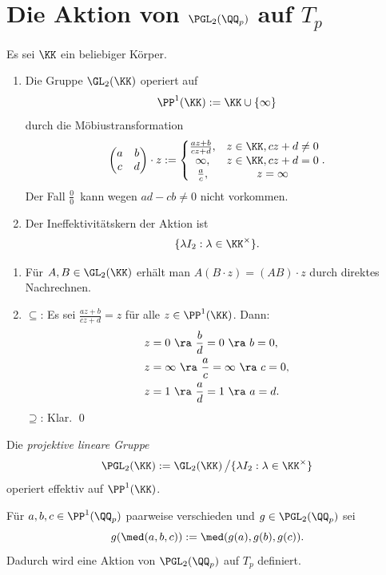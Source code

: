 \section{Die Aktion von $\PGL_2(\QQ_p)$ auf $T_p$}\label{sec_PGL}

\BEM Es sei $\KK$ ein beliebiger Körper.
\begin{enumerate}
\item Die Gruppe $\GL_2(\KK)$ operiert auf
\[
\PP^1(\KK) := \KK \cup \{\infty\}
\]
durch die Möbiustransformation
\[
\begin{pmatrix}
a & b \\
c & d
\end{pmatrix}\cdot z
:=
\left\{
\begin{matrix}
\frac{az+b}{cz+d}, & z\in\KK, cz+d\neq 0 \\
\infty, & z\in\KK, cz+d = 0 \\
\frac{a}{c}, & z=\infty
\end{matrix}
\right..
\]
Der Fall \glqq$\frac{0}{0}$\grqq\ kann wegen $ad-cb\neq 0$ nicht
vorkommen.
\item Der Ineffektivitätskern der Aktion ist
\[
\{ \lambda I_2 : \lambda\in\KK^\times \}.
\]
\end{enumerate}
\bew \begin{enumerate}
\item Für $A,B\in\GL_2(\KK)$ erhält man $A(B\cdot z)=(AB)\cdot z$
durch direktes Nachrechnen.
\item
\glqq$\subseteq$\grqq:
Es sei $\frac{az+b}{cz+d} = z$ für alle $z\in\PP^1(\KK)$.
Dann:
\begin{align*}
&z=0\ \ra\ \frac{b}{d}=0\ \ra\ b=0, \\
&z=\infty\ \ra\ \frac{a}{c}=\infty\ \ra\ c=0, \\
&z=1\ \ra\ \frac{a}{d}=1\ \ra\ a=d.
\end{align*}
\glqq$\supseteq$\grqq: Klar.
\qed
\end{enumerate}

\FOLG Die \emph{projektive lineare Gruppe}
\[
\PGL_2(\KK) := \GL_2(\KK)\left/\{ \lambda I_2 : \lambda\in\KK^\times\}\right.
\]
operiert effektiv auf $\PP^1(\KK)$.

\PROP Für $a,b,c\in\PP^1(\QQ_p)$ paarweise verschieden und
$g\in\PGL_2(\QQ_p)$ sei
\[
g(\med(a,b,c)) := \med(g(a),g(b),g(c)).
\]
Dadurch wird eine Aktion von $\PGL_2(\QQ_p)$ auf $T_p$ definiert.

